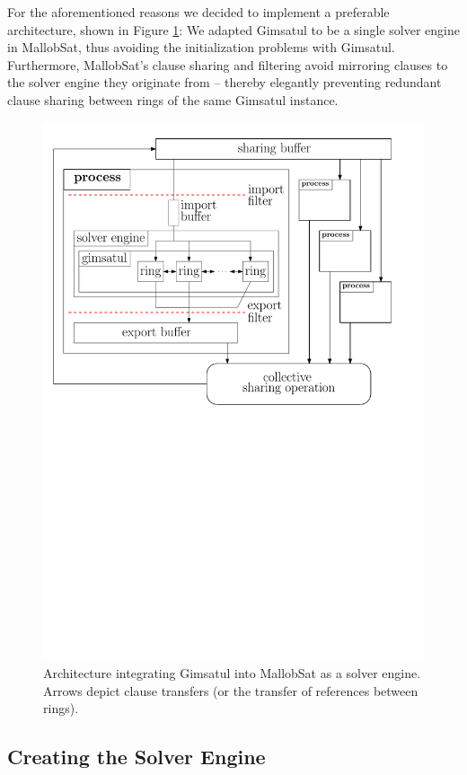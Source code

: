 \documentclass[12pt,a4paper,twoside]{scrartcl}
\numberwithin{equation}{section}
\begin{document}
For the aforementioned reasons we decided to implement a preferable architecture, shown in Figure \ref{fig:architecture}: We adapted Gimsatul to be a single solver engine in MallobSat, thus avoiding the initialization problems with Gimsatul. Furthermore, MallobSat's clause sharing and filtering avoid mirroring clauses to the solver engine they originate from -- thereby elegantly preventing redundant clause sharing between rings of the same Gimsatul instance.

\begin{figure}[!h]
  \center
  \includegraphics[scale=.8]{figures/architecture.pdf}
  \caption{Architecture integrating Gimsatul into MallobSat as a solver engine. Arrows depict clause transfers (or the transfer of references between rings).}
  \label{fig:architecture}
\end{figure}

\subsection{Creating the Solver Engine}
\end{document}
